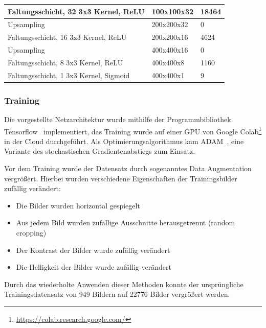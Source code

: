 \begin{table}
\begin{tabular}{|l|l|l|}
        \hline

        Faltungsschicht, 32 3x3 Kernel, ReLU   & 100x100x32                  & 18464                     \\

        \hline

        Upsampling                             & 200x200x32                  & 0                         \\

        \hline

        Faltungsschicht, 16 3x3 Kernel, ReLU   & 200x200x16                  & 4624                      \\

        \hline

        Upsampling                             & 400x400x16                  & 0                         \\

        \hline

        Faltungsschicht, 8 3x3 Kernel, ReLU    & 400x400x8                   & 1160                      \\

        \hline

        Faltungsschicht, 1 3x3 Kernel, Sigmoid & 400x400x1                   & 9                         \\

        \hline
    \end{tabular}
\end{table}

\subsubsection{Training}

Die vorgestellte Netzarchitektur wurde mithilfe der
Programmbibliothek Tensorflow~\cite{tensorflow2015-whitepaper}
implementiert,
das Training wurde auf einer GPU von Google
Colab\footnote{\url{https://colab.research.google.com/}} in der Cloud
durchgef\"uhrt.
Als Optimierungsalgorithmus kam ADAM~\cite{adam},
eine Variante des stochastischen Gradientenabstiegs zum Einsatz.

Vor dem Training wurde der Datensatz durch sogenanntes Data Augmentation
vergr\"o{\ss}ert. Hierbei wurden verschiedene Eigenschaften der
Trainingsbilder zuf\"allig ver\"andert:
\begin{itemize}
    \item Die Bilder wurden horizontal gespiegelt
    \item Aus jedem Bild wurden zuf\"allige Ausschnitte herausgetrennt (random cropping)
    \item Der Kontrast der Bilder wurde zuf\"allig ver\"andert
    \item Die Helligkeit der Bilder wurde zuf\"allig ver\"andert
\end{itemize}
Durch das wiederholte Anwenden dieser Methoden konnte der urspr\"ungliche
Trainingsdatensatz von 949 Bildern auf 22776 Bilder vergr\"o{\ss}ert werden.

